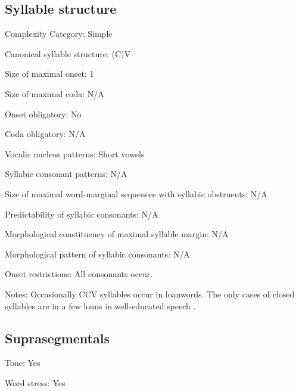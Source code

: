 {\subsection*{Syllable structure}
\begin{appendixdesc}

\item[Complexity Category:] Simple

\item[Canonical syllable structure:] (C)V \citep[112--114]{Morse1976}

\item[Size of maximal onset:] 1

\item[Size of maximal coda:] N/A

\item[Onset obligatory:] No

\item[Coda obligatory:] N/A

\item[Vocalic nucleus patterns:] Short vowels

\item[Syllabic consonant patterns:] N/A

\item[Size of maximal word-marginal sequences with syllabic obstruents:] N/A

\item[Predictability of syllabic consonants:] N/A

\item[Morphological constituency of maximal syllable margin:] N/A

\item[Morphological pattern of syllabic consonants:] N/A

\item[Onset restrictions:] All consonants occur.

\item[Notes:] Occasionally CCV syllables occur in loanwords. The only cases of closed syllables are in a few  loans in well-educated speech \citep[113]{Morse1976}.
\end{appendixdesc}
\subsection*{Suprasegmentals}
\begin{appendixdesc}
\item[Tone:] Yes

\item[Word stress:] Yes


\end{appendixdesc}}
